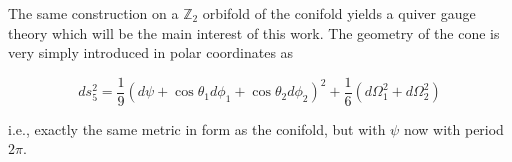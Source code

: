 The same construction on a $\mathbb{Z}_2$ orbifold of the conifold yields a quiver gauge theory which will be the main interest of this work. The geometry of the cone is very simply introduced in polar coordinates as 

\begin{equation}
	ds^2_5 = \frac{1}{9} (d\psi + \cos\theta_1 d\phi_1 + \cos\theta_2 d\phi_2)^2 + \frac{1}{6} (d\Omega_1^2 + d\Omega_2^2)
\end{equation}

i.e., exactly the same metric in form as the conifold, but with $\psi$ now with period $2\pi$.\\


